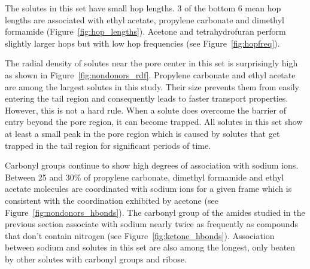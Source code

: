 \documentclass[journal=jpcbfk,manuscript=article]{achemso}
\begin{document}
  The solutes in this set have small hop lengths. 3 of the bottom 6 mean hop
  lengths are associated with ethyl acetate, propylene carbonate and
  dimethyl formamide (Figure~\ref{fig:hop_lengths}). Acetone and 
  tetrahydrofuran perform slightly larger hops but with low hop frequencies
  (see Figure~\ref{fig:hopfreq}).
  
  The radial density of solutes near the pore center in this set is 
  surprisingly high as shown in Figure~\ref{fig:nondonors_rdf}. Propylene
  carbonate and ethyl acetate are among the largest solutes in this study. 
  Their size prevents them from easily entering the tail region and 
  consequently leads to faster transport properties.  %
  However, this is not a hard rule. When a solute does overcome the 
  barrier of entry beyond the pore region, it can become trapped. All
  solutes in this set show at least a small peak in the pore region which
  is caused by solutes that get trapped in the tail region for 
  significant periods of time.
  
  Carbonyl groups continue to show high degrees of association with
  sodium ions. Between 25 and 30\% of propylene carbonate, dimethyl 
  formamide and ethyl acetate molecules are coordinated with sodium ions
  for a given frame which is consistent with the coordination exhibited by acetone
  (see Figure~\ref{fig:nondonors_hbonds}). The carbonyl group of the amides 
  studied in the previous section associate with sodium nearly twice as 
  frequently as compounds that don't contain nitrogen 
  (see Figure~\ref{fig:ketone_hbonds}).
  Association between sodium and solutes in this set are also among the longest,
  only beaten by other solutes with carbonyl groups and ribose.
 
\end{document}
